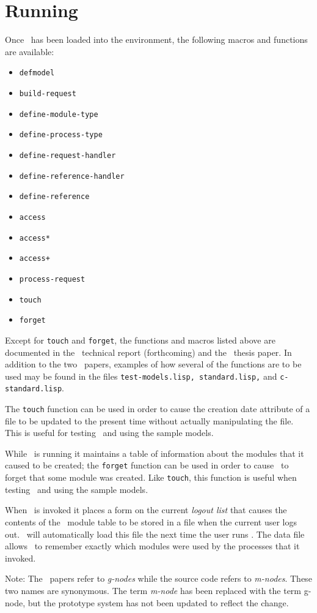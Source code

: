 \section{Running \build}

Once \build\ has been loaded into the environment, the following macros and
functions are available:
\begin{itemize}
\item {\tt defmodel}
\item {\tt build-request}
\item {\tt define-module-type}
\item {\tt define-process-type}
\item {\tt define-request-handler}
\item {\tt define-reference-handler}
\item {\tt define-reference}
\item {\tt access}
\item {\tt access*}
\item {\tt access+}
\item {\tt process-request}
\item {\tt touch}
\item {\tt forget}
\end{itemize}
Except for {\tt touch} and {\tt forget}, the functions and macros listed
above are documented in the \build\ technical report (forthcoming) and
the \build\ thesis paper.  In addition to the two \build\ papers, examples
of how several of the functions are to be used may be found in the files
{\tt test-models.lisp, standard.lisp,} and {\tt c-standard.lisp}.

The {\tt touch} function can be used in order to cause the creation
date attribute of a file to be updated to the present time without
actually manipulating the file.  This is useful for testing \build\ and
using the sample models.

While \build\ is running it maintains a table of information about the
modules that it caused to be created; the {\tt forget} function can
be used in order to cause \build\ to forget that some module was created.
Like {\tt touch}, this function is useful when testing \build\ and using the
sample models.

When \build\ is invoked it places a form on the current {\em logout list\/}
that causes the contents of the \build\ module table to be stored in a file
when the current user logs out.  \build\ will automatically load this
file the next time the user runs \build.  The data file allows \build\
to remember exactly which modules were used by the processes that it invoked.

Note: The \build\ papers refer to {\em g-nodes} while the source code refers to
{\em m-nodes}.  These two names are synonymous.  The term {\em m-node} has been
replaced with the term {\rm g-node,} but the prototype system has not been
updated to reflect the change.

